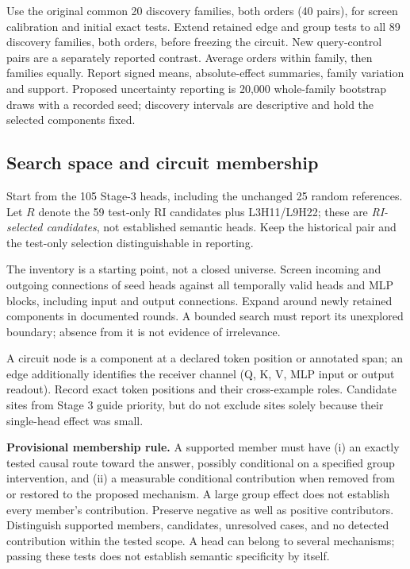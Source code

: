 \documentclass[11pt,a4paper]{article}
\begin{document}
Use the original common 20 discovery families, both orders (40 pairs), for
screen calibration and initial exact tests. Extend retained edge and group
tests to all 89 discovery families, both orders, before freezing the circuit.
New query-control pairs are a separately reported contrast. Average orders
within family, then families equally. Report signed means, absolute-effect
summaries, family variation and support. Proposed uncertainty reporting is
20,000 whole-family bootstrap draws with a recorded seed; discovery intervals
are descriptive and hold the selected components fixed.

\subsection{Search space and circuit membership}
Start from the 105 Stage-3 heads, including the unchanged 25 random references.
Let $R$ denote the 59 test-only RI candidates plus L3H11/L9H22; these are
\emph{RI-selected candidates}, not established semantic heads. Keep the
historical pair and the test-only selection distinguishable in reporting.

The inventory is a starting point, not a closed universe. Screen incoming and
outgoing connections of seed heads against all temporally valid heads and MLP
blocks, including input and output connections. Expand around newly retained
components in documented rounds. A bounded search must report its unexplored
boundary; absence from it is not evidence of irrelevance.

A circuit node is a component at a declared token position or annotated span;
an edge additionally identifies the receiver channel (Q, K, V, MLP input or
output readout). Record exact token positions and their cross-example roles.
Candidate sites from Stage 3 guide priority, but do not exclude sites solely
because their single-head effect was small.

\textbf{Provisional membership rule.} A supported member must have (i) an
exactly tested causal route toward the answer, possibly conditional on a
specified group intervention, and (ii) a measurable conditional contribution
when removed from or restored to the proposed mechanism. A large group effect
does not establish every member's contribution. Preserve negative as well as
positive contributors. Distinguish supported members, candidates, unresolved
cases, and no detected contribution within the tested scope. A head can belong
to several mechanisms; passing these tests does not establish semantic
specificity by itself.
\end{document}
